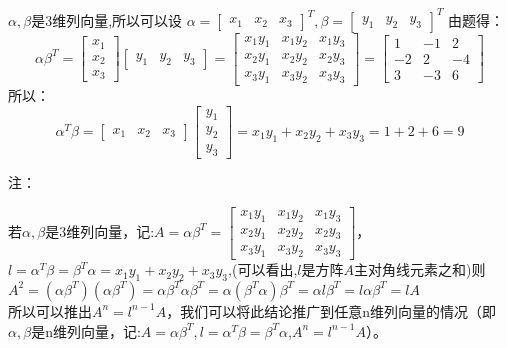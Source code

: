 \documentclass{article}
\begin{document}
\begin{jie}
$\alpha,\beta$是3维列向量,所以可以设
$\alpha=\begin{bmatrix}
          x_{1} & x_{2} & x_{3}
        \end{bmatrix}^{T},\beta=\begin{bmatrix}
          y_{1} & y_{2} & y_{3}
        \end{bmatrix}^{T}$
由题得：
\begin{equation*}
\alpha\beta^{T}=
\begin{bmatrix}
          x_{1}\\
          x_{2}\\
          x_{3}
        \end{bmatrix}
        \begin{bmatrix}
          y_{1} & y_{2} & y_{3}
        \end{bmatrix}=
        \begin{bmatrix}
          x_{1}y_{1} & x_{1}y_{2} & x_{1}y_{3}\\
          x_{2}y_{1} & x_{2}y_{2} & x_{2}y_{3}\\
          x_{3}y_{1} & x_{3}y_{2} & x_{3}y_{3}
        \end{bmatrix}=
\begin{bmatrix}
    1 & -1 & 2 \\
    -2 & 2& -4\\
    3 & -3 & 6
  \end{bmatrix}
\end{equation*}
所以：
\begin{equation*}
 \alpha^{T}\beta=
\begin{bmatrix}
x_{1} & x_{2} & x_{3}
\end{bmatrix}
\begin{bmatrix}
  y_{1} \\
  y_{2} \\
 y_{3}
\end{bmatrix}=x_{1}y_{1}+x_{2}y_{2}+x_{3}y_{3}=1+2+6=9
\end{equation*}

\textcolor[rgb]{1.00,0.00,0.00}{注：}

\textcolor[rgb]{1.00,0.00,0.00}{若$\alpha,\beta$是3维列向量，记:$A=\alpha\beta^{T}=\begin{bmatrix}
          x_{1}y_{1} & x_{1}y_{2} & x_{1}y_{3}\\
          x_{2}y_{1} & x_{2}y_{2} & x_{2}y_{3}\\
          x_{3}y_{1} & x_{3}y_{2} & x_{3}y_{3}
        \end{bmatrix}$，}
        \textcolor[rgb]{1.00,0.00,0.00}{
        $l=\alpha^{T}\beta=\beta^{T}\alpha=x_{1}y_{1}+x_{2}y_{2}+x_{3}y_{3}$,(可以看出,$l$是方阵$A$主对角线元素之和)则\\
        $A^{2}=(\alpha\beta^{T})(\alpha\beta^{T})=\alpha\beta^{T}\alpha\beta^{T}=\alpha(\beta^{T}\alpha)\beta^{T}=\alpha l \beta^{T}=l\alpha\beta^{T}=lA$\\
        所以可以推出$A^{n}=l^{n-1}A$，我们可以将此结论推广到任意n维列向量的情况（即$\alpha,\beta$是n维列向量，记:$A=\alpha\beta^{T},l=\alpha^{T}\beta=\beta^{T}\alpha$,$A^{n}=l^{n-1}A$）。
        }
\end{jie}
\end{document}
